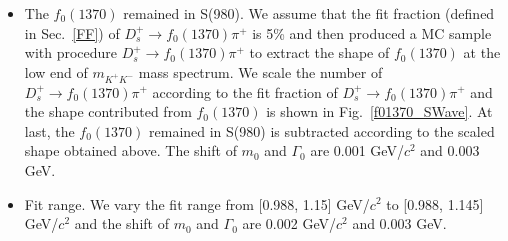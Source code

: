 {\begin{itemize}
        \item \uppercase\expandafter{} The $f_{0}(1370)$ remained in S(980). 
            We assume that the fit fraction (defined in Sec.~\ref{FF}) of $D_{s}^{+} \rightarrow f_{0}(1370)\pi^{+}$ is 5\% and then produced a MC sample with procedure $D_{s}^{+} \rightarrow f_{0}(1370)\pi^{+}$ to extract the shape of $f_{0}(1370)$ at the low end of $m_{K^{+}K^{-}}$ mass spectrum.
            We scale the number of $D_{s}^{+} \rightarrow f_{0}(1370)\pi^{+}$ according to the fit fraction of $D_{s}^{+} \rightarrow f_{0}(1370)\pi^{+}$ and the shape contributed from $f_{0}(1370)$ is shown in Fig.~\ref{f01370_SWave}.
            At last, the $f_{0}(1370)$ remained in S(980) is subtracted according to the scaled shape obtained above.
            The shift of $m_{0}$ and $\Gamma_{0}$ are 0.001 GeV/$c^{2}$ and 0.003 GeV.


        \item \uppercase\expandafter{} Fit range. We vary the fit range from [0.988, 1.15] GeV/$c^{2}$ to [0.988, 1.145] GeV/$c^{2}$ and the shift of $m_{0}$ and $\Gamma_{0}$ are 0.002 GeV/$c^{2}$ and 0.003 GeV.  

    \end{itemize}


}
